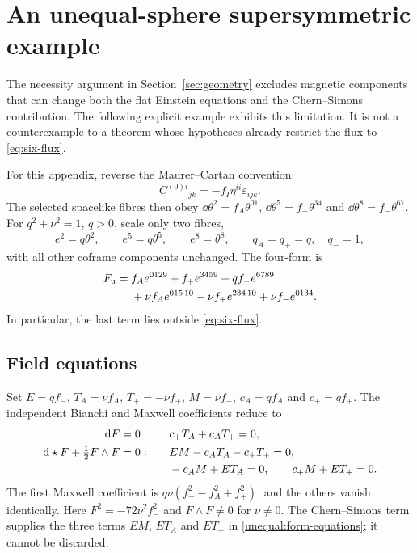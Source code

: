 \section{An unequal-sphere supersymmetric example}\label{app:unequal}
The necessity argument in Section~\ref{sec:geometry} excludes magnetic components that can change both the flat Einstein equations and the Chern--Simons contribution. The following explicit example exhibits this limitation. It is not a counterexample to a theorem whose hypotheses already restrict the flux to \eqref{eq:six-flux}.

For this appendix, reverse the Maurer--Cartan convention:
\begin{equation}
C^{(0)i}{}_{jk}=-f_I\eta^{ii}\varepsilon_{ijk}.
\label{unequal:mc}
\end{equation}
The selected spacelike fibres then obey $\dd\theta^2=f_A\theta^{01}$, $\dd\theta^5=f_+\theta^{34}$ and $\dd\theta^8=f_-\theta^{67}$. For $q^2+\nu^2=1$, $q>0$, scale only two fibres,
\begin{equation}
e^2=q\theta^2,\qquad e^5=q\theta^5,\qquad e^8=\theta^8,
\qquad q_A=q_+=q,\quad q_-=1,
\end{equation}
with all other coframe components unchanged. The four-form is
\begin{align}
F_{\rm u}={}&f_Ae^{0129}+f_+e^{3459}+qf_-e^{6789}\notag\\
&+\nu f_Ae^{015\,10}-\nu f_+e^{234\,10}+\nu f_-e^{0134}.
\label{unequal:flux}
\end{align}
In particular, the last term lies outside \eqref{eq:six-flux}.

\subsection{Field equations}
Set $E=qf_-$, $T_A=\nu f_A$, $T_+=-\nu f_+$, $M=\nu f_-$, $c_A=qf_A$ and $c_+=qf_+$. The independent Bianchi and Maxwell coefficients reduce to
\begin{align}
\mathrm{d} F=0:&\qquad c_+T_A+c_AT_+=0,\notag\\
\mathrm{d}\star F+\tfrac12F\wedge F=0:&\qquad
EM-c_AT_A-c_+T_+=0,\notag\\
&\qquad -c_AM+ET_A=0,\qquad c_+M+ET_+=0.
\label{unequal:form-equations}
\end{align}
The first Maxwell coefficient is $q\nu(f_-^2-f_A^2+f_+^2)$, and the others vanish identically. Here $F^2=-72\nu^2f_-^2$ and $F\wedge F\ne0$ for $\nu\ne0$. The Chern--Simons term supplies the three terms $EM$, $ET_A$ and $ET_+$ in \eqref{unequal:form-equations}; it cannot be discarded.

